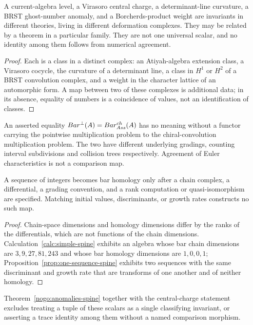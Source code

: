 \begin{theorem}
\label{nogo:anomalies-spine}
A current-algebra level, a Virasoro central charge, a determinant-line
curvature, a BRST ghost-number anomaly, and a Borcherds-product weight are
invariants in different theories, living in different deformation complexes.
They may be related by a theorem in a particular family. They are not one
universal scalar, and no identity among them follows from numerical agreement.
\end{theorem}
\begin{proof}
Each is a class in a distinct complex: an Atiyah-algebra extension class, a
Virasoro cocycle, the curvature of a determinant line, a class in $H^1$ or
$H^2$ of a BRST convolution complex, and a weight in the character lattice of
an automorphic form. A map between two of these complexes is additional data;
in its absence, equality of numbers is a coincidence of values, not an
identification of classes.
\end{proof}

\begin{theorem}
An asserted equality $Bar^{\perp}(A)=Bar^{ch}_{Ass}(A)$ has no meaning without a
functor carrying the pointwise multiplication problem to the chiral-convolution
multiplication problem. The two have different underlying gradings, counting
interval subdivisions and collision trees respectively. Agreement of Euler
characteristics is not a comparison map.
\end{theorem}

\begin{theorem}
\label{nogo:scalar-spine}
A sequence of integers becomes bar homology only after a chain complex, a
differential, a grading convention, and a rank computation or quasi-isomorphism
are specified. Matching initial values, discriminants, or growth rates
constructs no such map.
\end{theorem}
\begin{proof}
Chain-space dimensions and homology dimensions differ by the ranks of the
differentials, which are not functions of the chain dimensions.
Calculation~\ref{calc:simple-spine} exhibits an algebra whose bar chain
dimensions are $3,9,27,81,243$ and whose bar homology dimensions are $1,0,0,1$;
Proposition~\ref{prop:one-sequence-spine} exhibits two sequences with the same
discriminant and growth rate that are transforms of one another and of neither
homology.
\end{proof}

Theorem~\ref{nogo:anomalies-spine} together with the central-charge statement
excludes treating a tuple of these scalars as a single classifying invariant,
or asserting a trace identity among them without a named comparison morphism.
